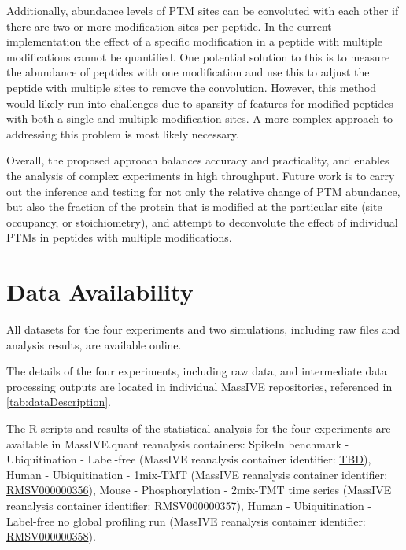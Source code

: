 \documentclass[mcp]{article}
\numberwithin{table}{section}
\begin{document}
Additionally, abundance levels of PTM sites can be convoluted with each other if there are two or more modification sites per peptide. In the current implementation the effect of a specific modification in a peptide with multiple modifications cannot be quantified. One potential solution to this is to measure the abundance of peptides with one modification and use this to adjust the peptide with multiple sites to remove the convolution. However, this method would likely run into challenges due to sparsity of features for modified peptides with both a single and multiple modification sites. A more complex approach to addressing this problem is most likely necessary.

Overall, the proposed approach balances accuracy and practicality, and enables the analysis of complex experiments in high throughput. Future work is to carry out the inference and testing for not only the relative change of PTM abundance, but also the fraction of the protein that is modified at the particular site (site occupancy, or stoichiometry), and attempt to deconvolute the effect of individual PTMs in peptides with multiple modifications.

\section{Data Availability}

All datasets for the four experiments and two simulations, including raw files and analysis results, are available online.

The details of the four experiments, including raw data, and intermediate data processing outputs are located in individual MassIVE repositories, referenced in \ref{tab:dataDescription}.

The R scripts and results of the statistical analysis for the four experiments are available in MassIVE.quant reanalysis containers: SpikeIn benchmark - Ubiquitination - Label-free (MassIVE reanalysis container identifier: \href{https://massive.ucsd.edu/ProteoSAFe/private-dataset.jsp?task=c4c583ecf7f941cdac87f7a4f872517b}{TBD}), Human - Ubiquitination - 1mix-TMT (MassIVE reanalysis container identifier: \href{https://massive.ucsd.edu/ProteoSAFe/reanalysis_container.jsp?task=b639fa5d0ff24ce78abdca13f4b18c0a}{RMSV000000356}), Mouse - Phosphorylation - 2mix-TMT time series (MassIVE reanalysis container identifier: \href{https://massive.ucsd.edu/ProteoSAFe/reanalysis_container.jsp?task=79406d32c1f9413daf7756e6eeb24968}{RMSV000000357}), Human - Ubiquitination - Label-free no global profiling run (MassIVE reanalysis container identifier: \href{https://massive.ucsd.edu/ProteoSAFe/reanalysis_container.jsp?task=f9e6117e00794ce5b2e8802601be16bc}{RMSV000000358}).
\end{document}
